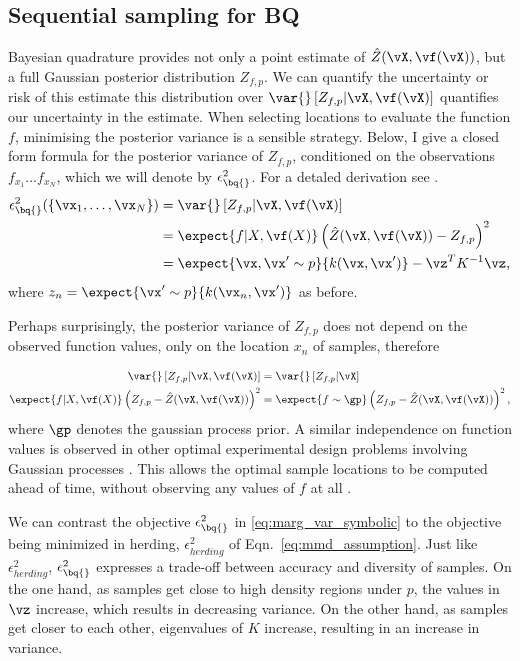 \subsection{Sequential sampling for BQ}

Bayesian quadrature provides not only a point estimate of $\hat{Z}(\vX,\vf(\vX))$, but a full Gaussian posterior distribution $Z_{f,p}$. We can quantify the uncertainty or risk of this estimate this distribution over $\var{} \left[ Z_{f,p} \vert \vX, \vf(\vX) \right]$ quantifies our uncertainty in the estimate. When selecting locations to evaluate the function $f$, minimising the posterior variance is a sensible strategy. Below, I give a closed form formula for the posterior variance of $Z_{f,p}$, conditioned on the observations $f_{x_1} \dots f_{x_N}$, which we will denote by $\epsilon^2_{\bq{}}$. For a detaled derivation see \citep{BZMonteCarlo}.
\begin{align}
	\epsilon^{2}_{\bq{}}(\{ \vx_1,\ldots,\vx_N \}) &= \var{} \left[ Z_{f,p} \vert \vX, \vf(\vX) \right]\\
	&= \expect{f\vert X,\vf(X)} \left( \hat{Z}(\vX,\vf(\vX)) - Z_{f,p} \right)^2\\
	&= \expect{\vx, \vx' \sim p}{k(\vx, \vx')} - \vz^T K^{-1} \vz\mbox{,}
		\label{eqn:marg_var_symbolic}
\end{align}
%
where $z_n = \expect{\vx' \sim p}{k(\vx_n, \vx')}$ as before.

Perhaps surprisingly, the posterior variance of $Z_{f,p}$ does not depend on the observed function values, only on the location $x_n$ of samples, therefore

\begin{align}
	\var{} \left[ Z_{f,p} \vert \vX, \vf(\vX) \right] &= \var{} \left[ Z_{f,p} \vert \vX \right]\\
\expect{f\vert X,\vf(X)} \left( Z_{f,p} - \hat{Z}(\vX,\vf(\vX))  \right)^2 &= \expect{f\sim\gp} \left( Z_{f,p} - \hat{Z}(\vX,\vf(\vX)) \right)^2,\label{eqn:variance_independent}
\end{align}
%
where $\gp$ denotes the gaussian process prior. A similar independence on function values is observed in other optimal experimental design problems involving Gaussian processes \citep{Krause2006}. This allows the optimal sample locations to be computed ahead of time, without observing any values of $f$ at all \citep{minka2000dqr}.

We can contrast the \bq{} objective $\epsilon^{2}_{\bq{}}$ in \eqref{eq:marg_var_symbolic} to the objective being minimized in herding, $\epsilon^{2}_{herding}$ of Eqn.\ \eqref{eq:mmd_assumption}. Just like $\epsilon^{2}_{herding}$, $\epsilon^{2}_{\bq{}}$ expresses a trade-off between accuracy and diversity of samples. On the one hand, as samples get close to high density regions under $p$, the values in $\vz$ increase, which results in decreasing variance. On the other hand, as samples get closer to each other, eigenvalues of $K$ increase, resulting in an increase in variance. 

